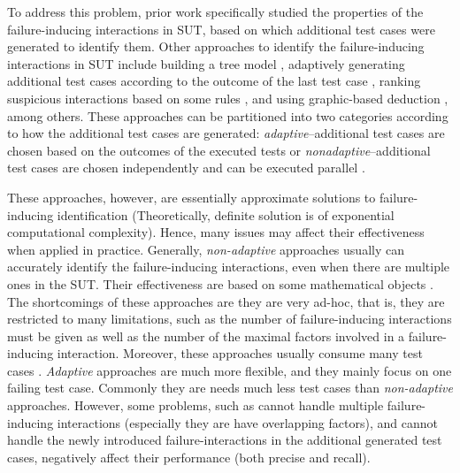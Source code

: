 \documentclass[10pt,journal,cspaper,compsoc]{IEEEtran}
\begin{document}
To address this problem, prior work \cite{nie2011minimal} specifically studied the properties of the failure-inducing interactions in SUT, based on which additional test cases were generated to identify them. Other approaches to identify the failure-inducing interactions in SUT include building a tree model \cite{yilmaz2006covering}, adaptively generating additional test cases according to the outcome of the last test case \cite{zhang2011characterizing}, ranking suspicious interactions based on some rules \cite{ghandehari2012identifying}, and using graphic-based deduction \cite{martinez2008algorithms}, among others. These approaches can be partitioned into two categories \cite{colbourn2008locating} according to how the additional test cases are generated: \emph{adaptive}--additional test cases are chosen based on the outcomes of the executed tests \cite{nie2011minimal,ghandehari2012identifying,niu2013identifying,zhang2011characterizing,shakya2012isolating,wang2010adaptive,li2012improved}or \emph{nonadaptive}--additional test cases are chosen independently and can be executed parallel \cite{yilmaz2006covering,colbourn2008locating,martinez2008algorithms,martinez2009locating}.

These approaches, however, are essentially approximate solutions to failure-inducing identification (Theoretically, definite solution is of exponential computational complexity). Hence, many issues may affect their effectiveness when applied in practice.  Generally, \emph{non-adaptive} approaches usually can accurately identify the failure-inducing interactions, even when there are multiple ones in the SUT. Their effectiveness are based on some mathematical objects \cite{colbourn2008locating,martinez2008algorithms,martinez2009locating}. The shortcomings of these approaches are they are very ad-hoc, that is, they are restricted to many limitations, such as the number of failure-inducing interactions must be given as well as the number of the maximal factors involved in a failure-inducing interaction. Moreover, these approaches usually consume many test cases \cite{zhang2011characterizing}. \emph{Adaptive} approaches are much more flexible, and they mainly focus on one failing test case. Commonly they are needs much less test cases than \emph{non-adaptive} approaches. However, some problems, such as cannot handle multiple failure-inducing interactions (especially they are have overlapping factors), and cannot handle the newly introduced failure-interactions in the additional generated test cases, negatively affect their performance (both precise and recall).
\end{document}
